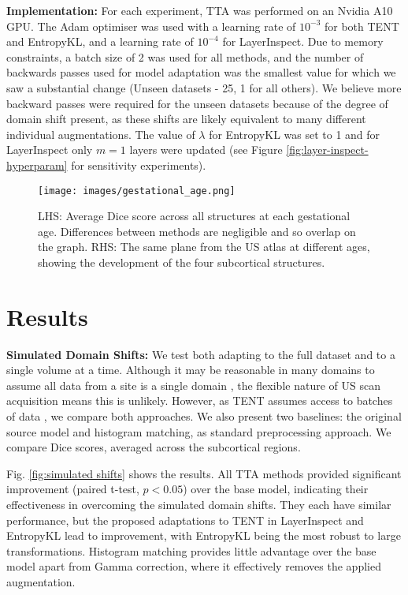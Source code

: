 \documentclass[conference]{IEEEtran}
\begin{document}
\noindent \textbf{Implementation:} For each experiment, TTA was performed on an Nvidia A10 GPU. The Adam optimiser was used with a learning rate of $10^{-3}$ for both TENT and EntropyKL, and a learning rate of $10^{-4}$ for LayerInspect. Due to memory constraints, a batch size of 2 was used for all methods, and the number of backwards passes used for model adaptation was the smallest value for which we saw a substantial change (Unseen datasets - 25, 1 for all others). We believe more backward passes were required for the unseen datasets because of the degree of domain shift present, as these shifts are likely equivalent to many different individual augmentations. The value of $\lambda$ for EntropyKL was set to 1 and for LayerInspect only $m=1$ layers were updated (see Figure \ref{fig:layer-inspect-hyperparam} for sensitivity experiments). 

\begin{figure}
    \centering
    \texttt{[image: images/gestational\_age.png]}
    \caption{LHS: Average Dice score across all structures at each gestational age. Differences between methods are negligible and so overlap on the graph.  RHS: The same plane from the US atlas \cite{Namburete2023} at different ages, showing the development of the four subcortical structures.}
    \label{fig:gestational week}
    \vspace*{-15pt}
\end{figure} 

\section{Results}
 \textbf{Simulated Domain Shifts:} We test both adapting to the full dataset and to a single volume at a time. Although it may be reasonable in many domains to assume all data from a site is a single domain \cite{Dinsdale2021Harm}, the flexible nature of US scan acquisition means this is unlikely. However, as TENT assumes access to batches of data \cite{Wang2021}, we compare both approaches. We also present two baselines: the original source model and histogram matching, as standard preprocessing approach. We compare Dice scores, averaged across the subcortical regions. 

 Fig. \ref{fig:simulated shifts} shows the results. All TTA methods provided significant improvement (paired t-test, $p<0.05$) over the base model, indicating their effectiveness in overcoming the simulated domain shifts. They each have similar performance, but the proposed adaptations to TENT in LayerInspect and EntropyKL lead to improvement, with EntropyKL being the most robust to large transformations. Histogram matching provides little advantage over the base model apart from Gamma correction, where it effectively removes the applied augmentation. 
\end{document}
